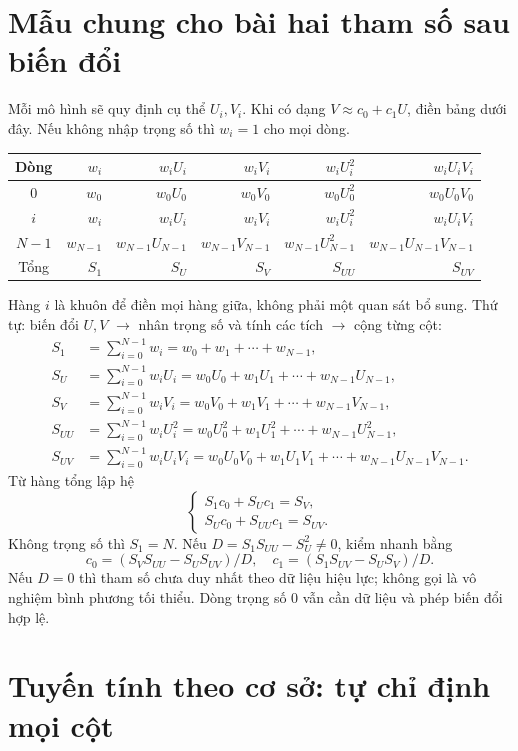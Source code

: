 \section{Mẫu chung cho bài hai tham số sau biến đổi}
\label{sec:ls-general-table}
Mỗi mô hình sẽ quy định cụ thể $U_i,V_i$. Khi có dạng $V\approx c_0+c_1U$, điền bảng dưới đây. Nếu không nhập trọng số thì $w_i=1$ cho mọi dòng.
\begin{center}\small\begin{tabular}{@{}crrrrr@{}}\toprule
Dòng&$w_i$&$w_iU_i$&$w_iV_i$&$w_iU_i^2$&$w_iU_iV_i$\\\midrule
0&$w_0$&$w_0U_0$&$w_0V_0$&$w_0U_0^2$&$w_0U_0V_0$\\
$i$&$w_i$&$w_iU_i$&$w_iV_i$&$w_iU_i^2$&$w_iU_iV_i$\\
$N-1$&$w_{N-1}$&$w_{N-1}U_{N-1}$&$w_{N-1}V_{N-1}$&$w_{N-1}U_{N-1}^2$&$w_{N-1}U_{N-1}V_{N-1}$\\\midrule
Tổng&$S_1$&$S_U$&$S_V$&$S_{UU}$&$S_{UV}$\\\bottomrule
\end{tabular}\end{center}
Hàng $i$ là khuôn để điền mọi hàng giữa, không phải một quan sát bổ sung. Thứ tự: biến đổi $U,V$ $\to$ nhân trọng số và tính các tích $\to$ cộng từng cột:
\begin{align*}
S_1&=\sum_{i=0}^{N-1}w_i=w_0+w_1+\cdots+w_{N-1},\\
S_U&=\sum_{i=0}^{N-1}w_iU_i=w_0U_0+w_1U_1+\cdots+w_{N-1}U_{N-1},\\
S_V&=\sum_{i=0}^{N-1}w_iV_i=w_0V_0+w_1V_1+\cdots+w_{N-1}V_{N-1},\\
S_{UU}&=\sum_{i=0}^{N-1}w_iU_i^2=w_0U_0^2+w_1U_1^2+\cdots+w_{N-1}U_{N-1}^2,\\
S_{UV}&=\sum_{i=0}^{N-1}w_iU_iV_i=w_0U_0V_0+w_1U_1V_1+\cdots+w_{N-1}U_{N-1}V_{N-1}.
\end{align*}
Từ hàng tổng lập hệ
\[
\boxed{\begin{cases}S_1c_0+S_Uc_1=S_V,\\S_Uc_0+S_{UU}c_1=S_{UV}.\end{cases}}
\]
Không trọng số thì $S_1=N$. Nếu $D=S_1S_{UU}-S_U^2\ne0$, kiểm nhanh bằng
\[
c_0=(S_VS_{UU}-S_US_{UV})/D,\quad c_1=(S_1S_{UV}-S_US_V)/D.
\]
Nếu $D=0$ thì tham số chưa duy nhất theo dữ liệu hiệu lực; không gọi là vô nghiệm bình phương tối thiểu. Dòng trọng số 0 vẫn cần dữ liệu và phép biến đổi hợp lệ.

\examplebreak
\section{Tuyến tính theo cơ sở: tự chỉ định mọi cột}
\label{sec:ls-linear-tool}
